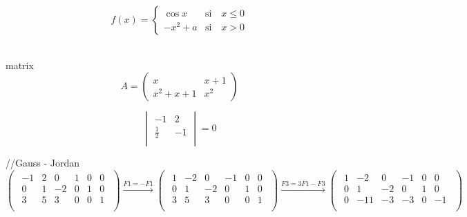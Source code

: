 $$f(x) = 
\begin{cases}
\cos x & \text{si } \text{ } x \leq 0\\
-x^2+a  & \text{si } \text{ } x > 0
\end{cases}
$$

\\matrix
$$A = 
\begin{pmatrix}
x & x+1 \\
x^{2}+x+1 & x^{2}
\end{pmatrix}
$$


$$
\begin{vmatrix} 
-1 & 2\\
\frac{1}{2} & -1\\
\end{vmatrix}=0 
$$

//Gauss - Jordan
$$
\begin{pmatrix}
\begin{array}{ccc|ccc}
-1 & 2 & 0 &1&0&0\\
0 & 1 & -2 &0&1&0\\
3&5&3&0&0&1\\
\end{array} 
\end{pmatrix}

\xrightarrow{F1=-F1}

\begin{pmatrix}
\begin{array}{ccc|ccc}
1 & -2 & 0 &-1&0&0\\
0 & 1 & -2 &0&1&0\\
3&5&3&0&0&1\\
\end{array} 
\end{pmatrix}


\xrightarrow{F3=3F1-F3}

\begin{pmatrix}
\begin{array}{ccc|ccc}
1 & -2 & 0 &-1&0&0\\
0 & 1 & -2 &0&1&0\\
0&-11&-3&-3&0&-1\\
\end{array} 
\end{pmatrix}

$$



